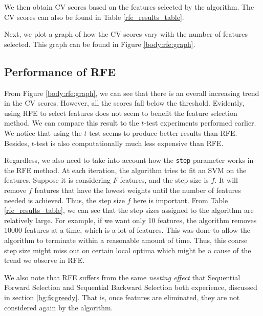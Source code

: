 \documentclass[12pt, twoside, a4paper]{report}
\begin{document}

We then obtain CV scores based on the features selected by the algorithm. The CV scores can also be found in Table \ref{rfe_results_table}.

Next, we plot a graph of how the CV scores vary with the number of features selected. This graph can be found in Figure \ref{body:rfe:graph}.


\subsection{Performance of RFE}
From Figure \ref{body:rfe:graph}, we can see that there is an overall increasing trend in the CV scores. However, all the scores fall below the threshold. Evidently, using RFE to select features does not seem to benefit the feature selection method. We can compare this result to the $t$-test experiments performed earlier. We notice that using the $t$-test seems to produce better results than RFE. Besides, $t$-test is also computationally much less expensive than RFE.

Regardless, we also need to take into account how the \texttt{step} parameter works in the RFE method. At each iteration, the algorithm tries to fit an SVM on the features. Suppose it is considering $F$ features, and the step size is $f$. It will remove $f$ features that have the lowest weights until the number of features needed is achieved. Thus, the step size $f$ here is important. From Table \ref{rfe_results_table}, we can see that the step sizes assigned to the algorithm are relatively large. For example, if we want only 10 features, the algorithm removes 10000 features at a time, which is a lot of features. This was done to allow the algorithm to terminate within a reasonable amount of time. Thus, this coarse step size might miss out on certain local optima which might be a cause of the trend we observe in RFE.

We also note that RFE suffers from the same \textit{nesting effect} that Sequential Forward Selection and Sequential Backward Selection both experience, discussed in section \ref{bg:fs:greedy}. That is, once features are eliminated, they are not considered again by the algorithm.
\end{document}
